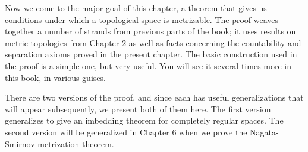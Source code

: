 Now we come to the major goal of this chapter, a theorem that gives us conditions under which a topological space is metrizable. The proof weaves together a number of strands from previous parts of the book; it uses results on metric topologies from Chapter 2 as well as facts concerning the countability and separation axioms proved in the present chapter. The basic construction used in the proof is a simple one, but very useful. You will see it several times more in this book, in various guises.

There are two versions of the proof, and since each has useful generalizations that will appear subsequently, we present both of them here. The first version generalizes to give an imbedding theorem for completely regular spaces. The second version will be generalized in Chapter 6 when we prove the Nagata-Smirnov metrization theorem.

